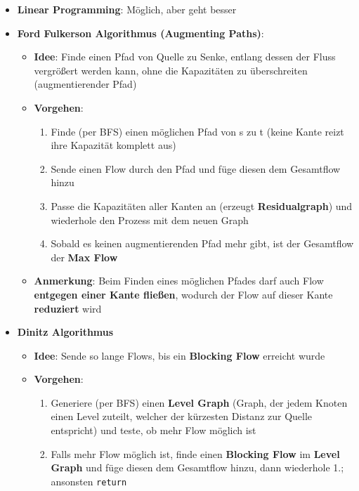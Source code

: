 \documentclass[10pt,a4paper]{article}
\begin{document}
	\begin{itemize}
		\item \textbf{Linear Programming}: Möglich, aber geht besser
		\item \textbf{Ford Fulkerson Algorithmus (Augmenting Paths)}:
		\begin{itemize}
			\item \textbf{Idee}: Finde einen Pfad von Quelle zu Senke, entlang dessen der Fluss vergrößert werden kann, ohne die Kapazitäten zu überschreiten (augmentierender Pfad)
			\item \textbf{Vorgehen}:
			\begin{enumerate}
				\item Finde (per BFS) einen möglichen Pfad von s zu t (keine Kante reizt ihre Kapazität komplett aus)
				\item Sende einen Flow durch den Pfad und füge diesen dem Gesamtflow hinzu
				\item Passe die Kapazitäten aller Kanten an (erzeugt \textbf{Residualgraph}) und wiederhole den Prozess mit dem neuen Graph
				\item Sobald es keinen augmentierenden Pfad mehr gibt, ist der Gesamtflow der \textbf{Max Flow}
			\end{enumerate}
			\item \textbf{Anmerkung}: Beim Finden eines möglichen Pfades darf auch Flow \textbf{entgegen einer Kante fließen}, wodurch der Flow auf dieser Kante \textbf{reduziert} wird
		\end{itemize}
		\newpage
		\item \textbf{Dinitz Algorithmus}
		\begin{itemize}
			\item \textbf{Idee}: Sende so lange Flows, bis ein \textbf{Blocking Flow} erreicht wurde
			\item \textbf{Vorgehen}:
			\begin{enumerate}
				\item Generiere (per BFS) einen \textbf{Level Graph} (Graph, der jedem Knoten einen Level zuteilt, welcher der kürzesten Distanz zur Quelle entspricht) und teste, ob mehr Flow möglich ist
				\item Falls mehr Flow möglich ist, finde einen \textbf{Blocking Flow} im \textbf{Level Graph} und füge diesen dem Gesamtflow hinzu, dann wiederhole 1.; ansonsten \texttt{return}
			\end{enumerate}
		\end{itemize}
	\end{itemize}
\end{document}
